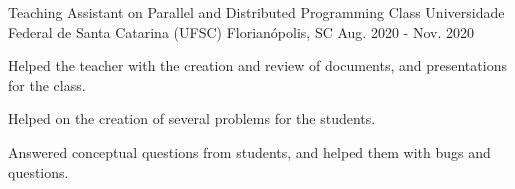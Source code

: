 

\begin{cventries}

  \cventry
    {Teaching Assistant on Parallel and Distributed Programming Class} %
    {Universidade Federal de Santa Catarina (UFSC)} %
    {Florianópolis, SC} %
    {Aug. 2020 - Nov. 2020} %
    {
      \begin{cvitems} %
        \item {Helped the teacher with the creation and review of documents, and
          presentations for the class.}
        \item {Helped on the creation of several problems for the students.}
        \item {Answered conceptual questions from students, and helped them with
          bugs and questions.}
      \end{cvitems}
    }

\end{cventries}
